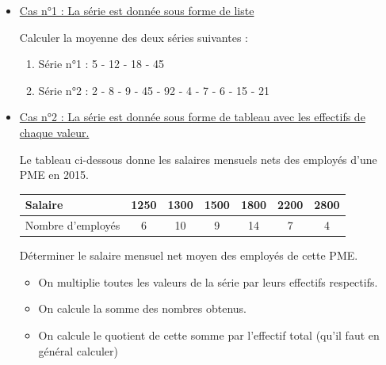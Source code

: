 \documentclass[a4paper]{book}
\begin{document}
    
    \begin{exemple}
        \begin{itemize}
            \item \underline{Cas n°1 : La série est donnée sous forme de liste}

            Calculer la moyenne des deux séries suivantes :

            \begin{enumerate}
                \item Série n°1 : 5 - 12 - 18 - 45
                \item Série n°2 : 2 - 8 - 9 - 45 - 92 - 4 - 7 - 6 - 15 - 21
            \end{enumerate}

            \item \underline{Cas n°2 : La série est donnée sous forme de tableau avec les effectifs de chaque valeur.}
            
            Le tableau ci-dessous donne les salaires mensuels nets des employés d’une PME en 2015.
    
            \begin{center}\begin{tabular}{|l|c|c|c|c|c|c|}
                \hline
                Salaire           & 1250 & 1300 & 1500 & 1800 & 2200 & 2800 \\ \hline
                Nombre d'employés & 6    & 10   & 9    & 14   & 7    & 4    \\ \hline
            \end{tabular}\end{center}
    
            Déterminer le salaire mensuel net moyen des employés de cette PME.

            \begin{methode}
                \begin{itemize}
                    \item On multiplie toutes les valeurs de la série par leurs effectifs respectifs.
                    \item On calcule la somme des nombres obtenus.
                    \item On calcule le quotient de cette somme par l'effectif total (qu'il faut en général calculer)
                \end{itemize}
            \end{methode}
        \end{itemize}
    \end{exemple}
\end{document}
